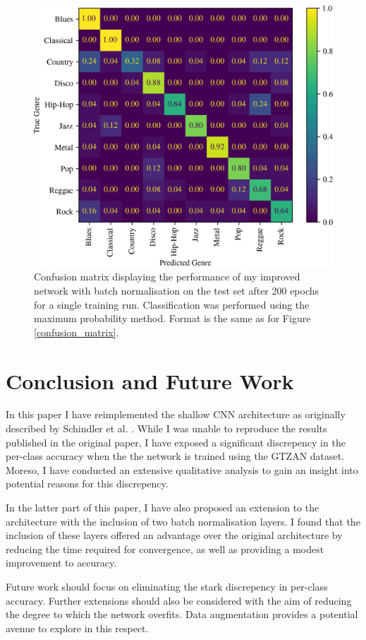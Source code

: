 \documentclass[conference]{IEEEtran}
\begin{document}
\begin{figure}[htbp]
    \centerline{\includegraphics[width=\columnwidth]{cm_improved.png}}
    \caption{
        Confusion matrix displaying the performance of my improved network with batch normalisation on the test set after 200 epochs for a single training run.
        Classification was performed using the maximum probability method.
        Format is the same as for Figure \ref{confusion_matrix}.
    }
    \label{confusion_matrix_improved}
\end{figure}

\section{Conclusion and Future Work}

In this paper I have reimplemented the shallow CNN architecture as originally described by Schindler et al. \cite{SchindlerLidyRauber}.
While I was unable to reproduce the results published in the original paper, I have exposed a significant discrepency in the per-class accuracy when the the network is trained using the GTZAN dataset.
Moreso, I have conducted an extensive qualitative analysis to gain an insight into potential reasons for this discrepency.

In the latter part of this paper, I have also proposed an extension to the architecture with the inclusion of two batch normalisation layers.
I found that the inclusion of these layers offered an advantage over the original architecture by reducing the time required for convergence, as well as providing a modest improvement to accuracy.

Future work should focus on eliminating the stark discrepency in per-class accuracy.
Further extensions should also be considered with the aim of reducing the degree to which the network overfits.
Data augmentation provides a potential avenue to explore in this respect.



\end{document}
